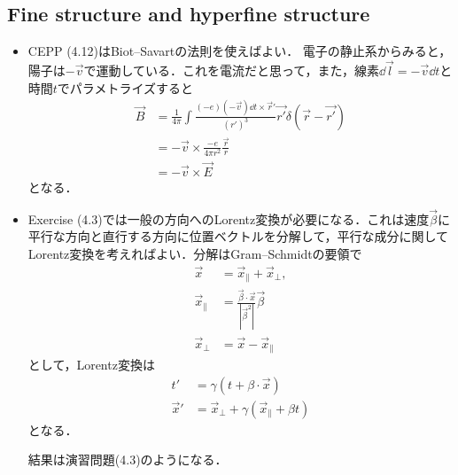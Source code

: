 \subsection{Fine structure and hyperfine structure}
\begin{itemize}
		\item CEPP (4.12)はBiot--Savartの法則を使えばよい．
				電子の静止系からみると，陽子は$-\vec{v} $で運動している．これを電流だと思って，また，線素$\dd{\vec{l}}=-\vec{v}\dd{t} $と時間$t $でパラメトライズすると
				\begin{align}
						\vec{B} &= \frac{1}{4\pi}\int\frac{(-e)(-\vec{v})\dd{t}\times\vec{r}'}{(r')^3}\vec{r'}\delta(\vec{r} - \vec{r'})\\
								&= -\vec{v}\times \frac{-e}{4\pi r^2}\frac{\vec{r}}{r}\\
								&= -\vec{v} \times \vec{E}
				\end{align}
				となる．
		\item Exercise (4.3)では一般の方向へのLorentz変換が必要になる．これは速度$\vec{\beta} $に平行な方向と直行する方向に位置ベクトルを分解して，平行な成分に関してLorentz変換を考えればよい．分解はGram--Schmidtの要領で
				\begin{align}
						\vec{x} &= \vec{x}_{\parallel}+\vec{x}_{\perp},\\
						\vec{x}_{\parallel} &= \frac{\vec{\beta}\cdot\vec{x}}{|\vec{\beta}^2|}\vec{\beta}\\
						\vec{x}_{\perp} &= \vec{x} - \vec{x}_{\parallel}
				\end{align}
				として，Lorentz変換は
				\begin{align}
						t' &= \gamma(t + \beta \cdot \vec{x})\\
						\vec{x}' &= \vec{x}_{\perp} + \gamma(\vec{x}_{\parallel} + \beta t)
				\end{align}
				となる．
				
				結果は演習問題(4.3)のようになる．
\end{itemize}
